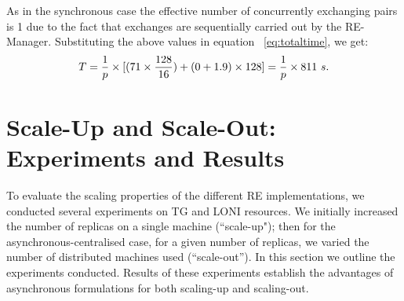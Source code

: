 \documentclass{rspublic}
\newcommand{\alnote}[1]{ {\textcolor{blue} { ***andre: #1 }}}
\newcommand{\athotanote}[1]{ {\textcolor{green} { ***athota: #1 }}}
\newcommand{\alnote}[1]{}
\newcommand{\athotanote}[1]{}
\begin{document}



As in the synchronous case the effective number of concurrently
exchanging pairs is 1 due to the fact that exchanges are sequentially
carried out by the RE-Manager.  Substituting the above values in
equation ~\ref{eq:totaltime}, we get:
\begin{eqnarray}
T=  {1 \over p} \times {[ {(71\times {128\over 16}}) + (0 + 1.9)\times 128]} = {1 \over p} \times 811~s.
\label{eq:cent}
\end{eqnarray}

\section{Scale-Up and Scale-Out: Experiments and
  Results}\label{sec:performance}

To evaluate the scaling properties of the different RE
implementations, we conducted several experiments on TG and LONI
resources. We initially increased the number of replicas on a single
machine (``scale-up"); then for the asynchronous-centralised case, for
a given number of replicas, we varied the number of distributed
machines used (``scale-out''). In this section we outline the
experiments conducted. Results of these experiments establish the
advantages of asynchronous formulations for both scaling-up and
scaling-out.

\end{document}
